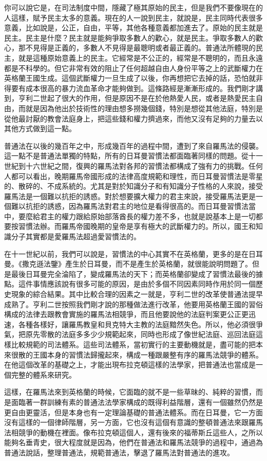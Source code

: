你可以說它是，在司法制度中間，隱藏了極其原始的民主，但是我們不要像現在的人這樣，賦予民主太多的意義。現在的人一說到民主，就說是，民主同時代表很多意義，比如說是，公正，自由，平等，其他各種意義都加進去了。原始的民主就是民主。民主是什麼？民主就是能夠爭取多數人的歡心，就是民主。爭取多數人的歡心，那不見得是正義的，多數人不見得是最聰明或者最正義的。普通法所體現的民主，就是這種原始意義上的民主。它經常是不公正的，經常是不聰明的，而且永遠都是不科學的。但它非常有效的阻止了任何超越自由人身份平等之上的武斷權力在英格蘭王國生成。這個武斷權力一旦生成了以後，你再想把它去掉的話，恐怕就非得要有成本很高的暴力流血革命才能夠做到。這條路經是漸漸形成的。我們剛才講到，亨利二世起了很大的作用，但是原因不是在於他熱愛人民，或者是熱愛民主自由，而就是因為他出於技術性的理由想多撈幾個錢，特別是想從其他法庭，特別是從他最討厭的教會法庭身上，把這些錢和權力擠過來，而他又沒有足夠的力量去以其他方式做到這一點。

普通法在以後的幾百年之中，形成幾百年的過程中間，遭到了來自羅馬法的侵襲。這一點不是普通法單獨的特點，所有的日耳曼習慣法都面臨著同樣的問題。從十一世紀到十六世紀之間，復興的羅馬法對各邦的習慣法都構成了強有力的挑戰。任何人都可以看出，晚期羅馬帝國形成的法律高度規範和理性，而日耳曼習慣法是零星的、散碎的、不成系統的。尤其是對於知識分子和有知識分子性格的人來說，接受羅馬法是一個難以抗拒的誘惑。對於想要擴大權力的君主來說，接受羅馬法更是一個難以抗拒的誘惑，因為羅馬法對君主的地位是看得很高的。而日耳曼習慣法當中，要麼給君主的權力跟給原始部落酋長的權力差不多，也就是說基本上是一切都要按習慣法辦。而羅馬帝國晚期的皇帝是享有極大的武斷權力的。所以，國王和知識分子其實都是愛羅馬法超過愛習慣法的。

在十一世紀以前，我們可以說是，習慣法的中心其實不在英格蘭，更多的是在日耳曼。《撒克遜法鑒》產生於日耳曼，而不是產生於英格蘭，就很能說明問題了。但是最後日耳曼完全淪陷了，變成羅馬法的天下；而英格蘭卻變成了習慣法最後的據點。這件事情應該說有很多可能的原因，是由於多個不同因素同時作用於同一個歷史現象的綜合結果。其中比較合理的因素之一就是，亨利二世的改革使普通法提早成熟了。亨利二世按照我們剛才說的那種做法進行改革，他要用英格蘭王國的習俗構成的法律去跟教會實施的羅馬法相競爭，而且他要說他的法庭判案更公正更迅速，各種各樣好，讓羅馬教皇和貝克特大主教的法庭黯然失色。所以，他必須很爭氣，把原先零散的法庭多多少少規範起來，同時也形成了像世紀法庭、巡回法庭這樣比較規範的司法體系。這些司法體系，當初實行的主要動機就是，盡可能的把本來很散的王國本身的習慣法歸攏起來，構成一種跟嚴整有序的羅馬法競爭的體系。在他這個改革的基礎之上，才能出現布拉克頓這樣的法學家，把普通法也當成是一個完整的體系來研究。

這樣，在羅馬法來到英格蘭的時候，它面臨的就不是一些草昧的、純粹的習慣，而是面臨著一群訓練有素的普通法法學家構成的既得利益階層，還有一個雖然仍然是更自由更靈活，但是本身也有一定理論基礎的普通法體系。而在日耳曼，它一方面沒有這樣的一個律師階層，另一方面，它也沒有這個有意識的整頓普通法來跟羅馬法相競爭的動機在裡面。像布拉克頓這個人，還有後來的福蒂斯丘這些人，之所以能夠名垂青史，很大程度就是因為，他們在普通法和羅馬法競爭的過程中，通過為普通法說話，整理普通法，規範普通法，擊退了羅馬法對普通法的進攻。

